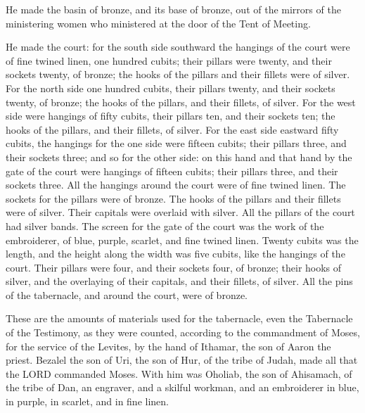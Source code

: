  He made the basin of bronze, and its base of bronze, out
of the mirrors of the ministering women who ministered at the door of
the Tent of Meeting.

 He made the court: for the south side southward the
hangings of the court were of fine twined linen, one hundred cubits;
 their pillars were twenty, and their sockets twenty, of
bronze; the hooks of the pillars and their fillets were of silver.
 For the north side one hundred cubits, their pillars
twenty, and their sockets twenty, of bronze; the hooks of the pillars,
and their fillets, of silver.  For the west side were
hangings of fifty cubits, their pillars ten, and their sockets ten; the
hooks of the pillars, and their fillets, of silver.  For
the east side eastward fifty cubits,  the hangings for
the one side were fifteen cubits; their pillars three, and their sockets
three;  and so for the other side: on this hand and that
hand by the gate of the court were hangings of fifteen cubits; their
pillars three, and their sockets three.  All the hangings
around the court were of fine twined linen.  The sockets
for the pillars were of bronze. The hooks of the pillars and their
fillets were of silver. Their capitals were overlaid with silver. All
the pillars of the court had silver bands.  The screen
for the gate of the court was the work of the embroiderer, of blue,
purple, scarlet, and fine twined linen. Twenty cubits was the length,
and the height along the width was five cubits, like the hangings of the
court.  Their pillars were four, and their sockets four,
of bronze; their hooks of silver, and the overlaying of their capitals,
and their fillets, of silver.  All the pins of the
tabernacle, and around the court, were of bronze.

 These are the amounts of materials used for the
tabernacle, even the Tabernacle of the Testimony, as they were counted,
according to the commandment of Moses, for the service of the Levites,
by the hand of Ithamar, the son of Aaron the priest. 
Bezalel the son of Uri, the son of Hur, of the tribe of Judah, made all
that the LORD commanded Moses.  With him was Oholiab, the
son of Ahisamach, of the tribe of Dan, an engraver, and a skilful
workman, and an embroiderer in blue, in purple, in scarlet, and in fine
linen.


